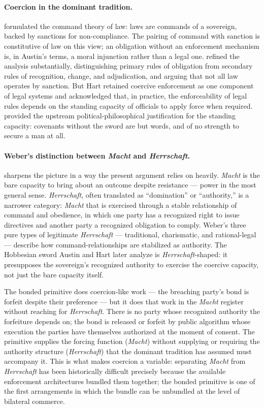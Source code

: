 \documentclass[11pt,a4paper]{article}
\theoremstyle{remark}
\begin{document}
\paragraph{Coercion in the dominant tradition.}
\citet{austin1832} formulated the command theory of law: laws are
commands of a sovereign, backed by sanctions for non-compliance.
The pairing of command with sanction is constitutive of law on
this view; an obligation without an enforcement mechanism is, in
Austin's terms, a moral injunction rather than a legal one.
\citet{hart1961} refined the analysis substantially, distinguishing
primary rules of obligation from secondary rules of recognition,
change, and adjudication, and arguing that not all law operates
by sanction. But Hart retained coercive enforcement as one
component of legal systems and acknowledged that, in practice,
the enforceability of legal rules depends on the standing
capacity of officials to apply force when required.
\citet{hobbes1651} provided the upstream
political-philosophical justification for the standing capacity:
covenants without the sword are but words, and of no strength to
secure a man at all.

\paragraph{Weber's distinction between \emph{Macht} and \emph{Herrschaft}.}
\citet{weber1922economy} sharpens the picture in a way the
present argument relies on heavily. \emph{Macht} is the bare
capacity to bring about an outcome despite resistance --- power
in the most general sense. \emph{Herrschaft}, often translated
as ``domination'' or ``authority,'' is a narrower category:
\emph{Macht} that is exercised through a stable relationship
of command and obedience, in which one party has a recognized
right to issue directives and another party a recognized
obligation to comply. Weber's three pure types of legitimate
\emph{Herrschaft} --- traditional, charismatic, and rational-legal
\citep{weber1919} --- describe how command-relationships
are stabilized as authority. The Hobbesian sword Austin and Hart
later analyze is \emph{Herrschaft}-shaped: it presupposes the
sovereign's recognized authority to exercise the coercive
capacity, not just the bare capacity itself.

The bonded primitive does coercion-like work --- the breaching
party's bond is forfeit despite their preference --- but it does
that work in the \emph{Macht} register without reaching for
\emph{Herrschaft}. There is no party whose recognized authority
the forfeiture depends on; the bond is released or forfeit by
public algorithm whose execution the parties have themselves
authorized at the moment of consent. The primitive supplies the
forcing function (\emph{Macht}) without supplying or requiring
the authority structure (\emph{Herrschaft}) that the dominant
tradition has assumed must accompany it. This is what makes
coercion a variable: separating \emph{Macht} from
\emph{Herrschaft} has been historically difficult precisely
because the available enforcement architectures bundled them
together; the bonded primitive is one of the first arrangements
in which the bundle can be unbundled at the level of bilateral
commerce.
\end{document}

